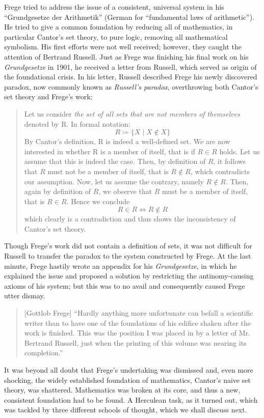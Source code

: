 \documentclass{article}
\begin{document}
Frege tried to address the issue of a consistent, universal system in his ``Grundgesetze der Arithmetik'' (German for ``fundamental laws of arithmetic''). He tried to give a common foundation by reducing all of mathematics, in particular Cantor's set theory, to pure logic, removing all mathematical symbolism. His first efforts were not well received; however, they caught the attention of Bertrand Russell. Just as Frege was finishing his final work on his \textit{Grundgesetze} in 1901, he received a letter from Russell, which served as origin of the foundational crisis. In his letter, Russell described Frege his newly discovered paradox, now commonly known as \textit{Russell's paradox}, overthrowing both Cantor's set theory and Frege's work:
\begin{quote}
Let us consider \textit{the set of all sets that are not members of themselves} denoted by R. In formal notation:
\begin{equation*}
	R\coloneqq\{X\mid X\notin X\}
\end{equation*}
By Cantor's definition, R is indeed a well-defined set.
We are now interested in whether R is a member of itself, that is if $R\in R$ holds.
Let us assume that this is indeed the case. Then, by definition of $R$, it follows that $R$ must not be a member of itself, that is $R\notin R$, which contradicts our assumption. Now, let us assume the contrary, namely $R\notin R$. Then, again by definition of $R$, we observe that $R$ must be a member of itself, that is $R\in R$. Hence we conclude
\begin{equation*}
		R\in R\iff R\notin R
\end{equation*}
which clearly is a contradiction and thus shows the inconsistency of Cantor's set theory.
\end{quote}
Though Frege's work did not contain a definition of sets, it was not difficult for Russell to transfer the paradox to the system constructed by Frege. At the last minute, Frege hastily wrote an appendix for his \textit{Grundgesetze}, in which he explained the issue and proposed a solution by restricting the antinomy-causing axioms of his system; but this was to no avail and consequently caused Frege utter dismay.
\begin{quote}[Gottlob Frege]
``Hardly anything more unfortunate can befall a scientific writer than to have one of the foundations of his edifice shaken after the work is finished. This was the position I was placed in by a letter of Mr. Bertrand Russell, just when the printing of this volume was nearing its completion.''\cite{frege_appendix}
\end{quote}
It was beyond all doubt that Frege's undertaking was dismissed and, even more shocking, the widely established foundation of mathematics, Cantor's naive set theory, was shattered. Mathematics was broken at its core, and thus a new, consistent foundation had to be found. A Herculean task, as it turned out, which was tackled by three different schools of thought, which we shall discuss next.
\end{document}
